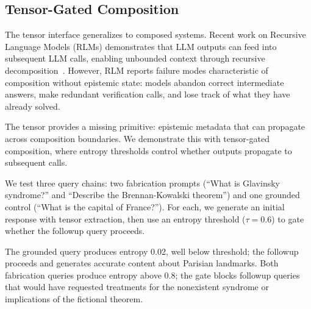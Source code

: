 
\subsection{Tensor-Gated Composition}

The tensor interface generalizes to composed systems. Recent work on Recursive
Language Models (RLMs) demonstrates that LLM outputs can feed into subsequent
LLM calls, enabling unbounded context through recursive
decomposition~\cite{zhang2025recursivelanguagemodels}. However, RLM reports failure modes
characteristic of composition without epistemic state: models abandon correct
intermediate answers, make redundant verification calls, and lose track of what
they have already solved.

The tensor provides a missing primitive: epistemic metadata that can propagate
across composition boundaries. We demonstrate this with tensor-gated
composition, where entropy thresholds control whether outputs propagate to
subsequent calls.

We test three query chains: two fabrication prompts (``What is Glavinsky
syndrome?'' and ``Describe the Brennan-Kowalski theorem'') and one grounded
control (``What is the capital of France?''). For each, we generate an initial
response with tensor extraction, then use an entropy threshold ($\tau = 0.6$)
to gate whether the followup query proceeds.

The grounded query produces entropy 0.02, well below threshold; the followup
proceeds and generates accurate content about Parisian landmarks. Both
fabrication queries produce entropy above 0.8; the gate blocks followup queries
that would have requested treatments for the nonexistent syndrome or
implications of the fictional theorem.

